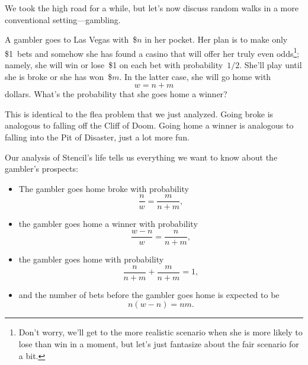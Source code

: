 We took the high road for a while, but let's now discuss random walks
in a more conventional setting---gambling.

A gambler goes to Las Vegas with~\$$n$ in her pocket.  Her plan is to
make only \$1~bets and somehow she has found a casino that will offer
her truly even odds\footnote{Don't worry, we'll get to the more
  realistic scenario when she is more likely to lose than win in a
  moment, but let's just fantasize about the fair scenario for a
  bit.}; namely, she will win or lose~\$1 on each bet with
probability~$1/2$. She'll play until she is broke or she has
won~\$$m$.  In the latter case, she will go home with
\begin{equation*}
    w = n + m
\end{equation*}
dollars. What's the probability that she goes home a winner?

This is identical to the flea problem that we just analyzed.  Going
broke is analogous to falling off the Cliff of Doom.  Going home a
winner is analogous to falling into the Pit of Disaster, just a lot
more fun.

Our analysis of Stencil's life tells us everything we want to know
about the gambler's prospects:
\begin{itemize}

\item

The gambler goes home broke with probability
\begin{equation*}
    \frac{n}{w} = \frac{m}{n + m},
\end{equation*}

\item

the gambler goes home a winner with probability
\begin{equation*}
    \frac{w - n}{w} = \frac{n}{n + m},
\end{equation*}

\item

the gambler goes home with probability
\begin{equation*}
    \frac{n}{n + m} + \frac{m}{n + m} = 1,
\end{equation*}

\item

and the number of bets before the gambler goes home is expected to be
\begin{equation*}
    n (w - n) = nm.
\end{equation*}

\end{itemize}

